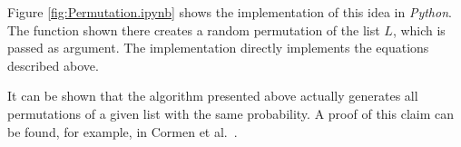 Figure \ref{fig:Permutation.ipynb} shows the implementation of this idea in \textsl{Python}. The function  shown
there creates a random permutation of the list $L$, which is passed as argument. The implementation directly
implements the equations described above. 

It can be shown that the algorithm presented above actually generates all permutations of a given list with the
same probability. A proof of this claim can be found, for example, in 
Cormen et al.~\cite{cormen:09}.



